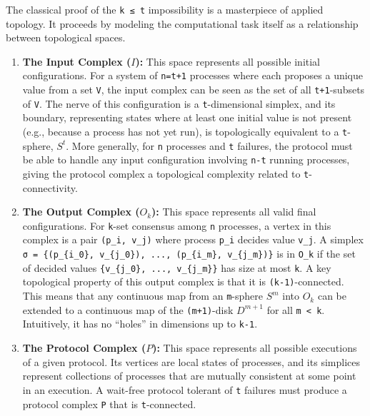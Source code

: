 \documentclass[
]{article}
\begin{document}
The classical proof of the \texttt{k\ ≤\ t} impossibility is a
masterpiece of applied topology. It proceeds by modeling the
computational task itself as a relationship between topological spaces.

\begin{enumerate}
\def\labelenumi{\arabic{enumi}.}
\item
  \textbf{The Input Complex (\(I\)):} This space represents all possible
  initial configurations. For a system of \texttt{n=t+1} processes where
  each proposes a unique value from a set \texttt{V}, the input complex
  can be seen as the set of all \texttt{t+1}-subsets of \texttt{V}. The
  nerve of this configuration is a \texttt{t}-dimensional simplex, and
  its boundary, representing states where at least one initial value is
  not present (e.g., because a process has not yet run), is
  topologically equivalent to a \texttt{t}-sphere, \(S^t\). More
  generally, for \texttt{n} processes and \texttt{t} failures, the
  protocol must be able to handle any input configuration involving
  \texttt{n-t} running processes, giving the protocol complex a
  topological complexity related to \texttt{t}-connectivity.
\item
  \textbf{The Output Complex (\(O_k\)):} This space represents all valid
  final configurations. For \texttt{k}-set consensus among \texttt{n}
  processes, a vertex in this complex is a pair \texttt{(p\_i,\ v\_j)}
  where process \texttt{p\_i} decides value \texttt{v\_j}. A simplex
  \texttt{σ\ =\ \{(p\_\{i\_0\},\ v\_\{j\_0\}),\ ...,\ (p\_\{i\_m\},\ v\_\{j\_m\})\}}
  is in \texttt{O\_k} if the set of decided values
  \texttt{\{v\_\{j\_0\},\ ...,\ v\_\{j\_m\}\}} has size at most
  \texttt{k}. A key topological property of this output complex is that
  it is \texttt{(k-1)}-connected. This means that any continuous map
  from an \texttt{m}-sphere \(S^m\) into \(O_k\) can be extended to a
  continuous map of the \texttt{(m+1)}-disk \(D^{m+1}\) for all
  \texttt{m\ \textless{}\ k}. Intuitively, it has no ``holes'' in
  dimensions up to \texttt{k-1}.
\item
  \textbf{The Protocol Complex (\(P\)):} This space represents all
  possible executions of a given protocol. Its vertices are local states
  of processes, and its simplices represent collections of processes
  that are mutually consistent at some point in an execution. A
  wait-free protocol tolerant of \texttt{t} failures must produce a
  protocol complex \texttt{P} that is \texttt{t}-connected.
\end{enumerate}
\end{document}
